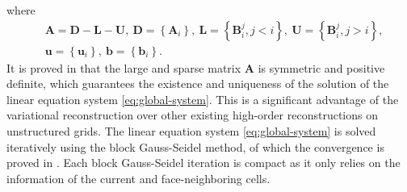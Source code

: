 where
\begin{equation}
    \begin{aligned}
         & \mathbf{A}= \mathbf{D} -  \mathbf{L} -  \mathbf{U},
        \ \mathbf{D}= \left\{\mathbf{A}_i\right\},
        \ \mathbf{L}= \left\{\mathbf{B}^j_i, j<i\right\},
        \ \mathbf{U}= \left\{\mathbf{B}^j_i, j>i\right\},
        \\
         & \mathbf{u}= \left\{\mathbf{u}_i\right\}, \ \mathbf{b}= \left\{\mathbf{b}_i\right\}.
    \end{aligned}
\end{equation}
It is proved in \cite{wang2017compact_VR} that the large and sparse matrix $\mathbf{A}$ is symmetric and positive definite, which guarantees the existence and uniqueness of the solution of the linear equation system \eqref{eq:global-system}. This is a significant advantage of the variational reconstruction over other existing high-order reconstructions on unstructured grids. 
{The linear equation system \eqref{eq:global-system} is solved iteratively using the block Gauss-Seidel method, of which the convergence is proved in \cite{wang2017compact_VR}. Each block Gauss-Seidel iteration is compact as it only relies on the information of the current and face-neighboring cells.}

